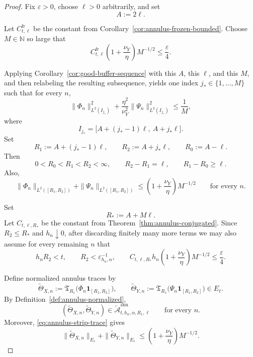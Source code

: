 \documentclass[11pt,a4paper]{amsart}
\theoremstyle{plain}
\theoremstyle{definition}
\theoremstyle{remark}
\newcommand{\one}{\mathbf 1}
\begin{document}
\begin{proof}
Fix \(\varepsilon>0\), choose \(\ell>0\) arbitrarily, and set
\[
A:=2\ell.
\]

Let \(C_{t,\ell}^{\mathrm{fr}}\) be the constant from
Corollary~\ref{cor:annulus-frozen-bounded}. Choose \(M\in\mathbb N\) so large that
\[
C_{t,\ell}^{\mathrm{fr}}
\left(1+\frac{\nu_Y}{\eta}\right)M^{-1/2}
\le
\frac{\varepsilon}{4}.
\]

Applying Corollary~\ref{cor:good-buffer-sequence} with this \(A\), this \(\ell\), and this \(M\),
and then relabeling the resulting subsequence, yields one index \(j_*\in\{1,\dots,M\}\) such that
for every \(n\),
\[
\|\Phi_n\|_{L^2(I_{j_*})}^2
+
\frac{\eta^2}{\nu_Y^2}
\|\Psi_n\|_{L^2(I_{j_*})}^2
\le
\frac{1}{M},
\]
where
\[
I_{j_*}
=
\bigl[A+(j_*-1)\ell,\ A+j_*\ell\bigr].
\]
Set
\[
R_1:=A+(j_*-1)\ell,
\qquad
R_2:=A+j_*\ell,
\qquad
R_0:=A-\ell.
\]
Then
\[
0<R_0<R_1<R_2<\infty,
\qquad
R_2-R_1=\ell,
\qquad
R_1-R_0\ge \ell.
\]
Also,
\begin{equation}\label{eq:annulus-strip-trace}
\|\Phi_n\|_{L^2([R_1,R_2])}
+
\|\Psi_n\|_{L^2([R_1,R_2])}
\le
\left(1+\frac{\nu_Y}{\eta}\right)M^{-1/2}
\qquad\text{for every }n.
\end{equation}

Set
\[
R_*:=A+M\ell.
\]
Let \(C_{t,\ell,R_*}\) be the constant from Theorem~\ref{thm:annulus-conjugated}. Since
\(R_2\le R_*\) and \(h_n\downarrow0\), after discarding finitely many more terms we may also assume
for every remaining \(n\) that
\[
h_nR_2<t,
\qquad
R_2<\varepsilon_{h_n,\alpha}^{-1},
\qquad
C_{t,\ell,R_*}h_n
\left(1+\frac{\nu_Y}{\eta}\right)M^{-1/2}
\le
\frac{\varepsilon}{4}.
\]

Define normalized annulus traces by
\[
\widetilde\Theta_{X,n}
:=
\mathfrak T_{R_1}\bigl(\Phi_n\one_{[R_1,R_2]}\bigr),
\qquad
\widetilde\Theta_{Y,n}
:=
\mathfrak T_{R_1}\bigl(\Psi_n\one_{[R_1,R_2]}\bigr)
\in E_\ell.
\]
By Definition~\ref{def:annulus-normalized},
\[
(\widetilde\Theta_{X,n},\widetilde\Theta_{Y,n})
\in
\widetilde{\mathcal A}_{t,h_n,\alpha,R_1,\ell}^{\mathrm{ann}}
\qquad\text{for every }n.
\]
Moreover, \eqref{eq:annulus-strip-trace} gives
\begin{equation}\label{eq:annulus-strip-normalized}
\|\widetilde\Theta_{X,n}\|_{E_\ell}
+
\|\widetilde\Theta_{Y,n}\|_{E_\ell}
\le
\left(1+\frac{\nu_Y}{\eta}\right)M^{-1/2}.
\end{equation}


\end{proof}
\end{document}
